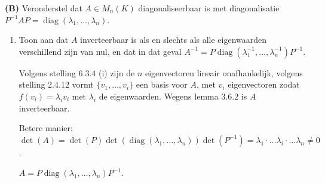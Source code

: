\begin{oefening}[6.3.5] \textbf{(B)}
    Veronderstel dat $A \in M_n(K)$ diagonaliseerbaar is met diagonalisatie $P^{-1}AP = \operatorname{diag}(\lambda_1, \dots, \lambda_n)$.
    \begin{enumerate}
        \item[(a)] Toon aan dat $A$ inverteerbaar is als en slechts als alle eigenwaarden verschillend zijn van nul, en dat in dat geval $A^{-1} = P \operatorname{diag}(\lambda_1^{-1}, \dots, \lambda_n^{-1})P^{-1}$.

        Volgens stelling 6.3.4 (i) zijn de \(n\) eigenvectoren lineair onafhankelijk,
        volgens stelling 2.4.12 vormt \(\{v_1,\dots,v_i\}\) een basis voor \(A\), met \(v_i\) eigenvectoren zodat \(f(v_i) = \lambda_i v_i\) met \(\lambda_i\) de eigenwaarden.
        Wegens lemma 3.6.2 is \(A\) inverteerbaar.

        Betere manier:
        \(\det(A) = \det(P) \det(\operatorname{diag}(\lambda_1, \dots, \lambda_n)) \det(P^{-1}) = \lambda_1 \cdot \dots \lambda_i \cdot \dots \lambda_n \neq 0\).

        \(A = P \operatorname{diag}(\lambda_1, \dots, \lambda_n) P^{-1} \).


\end{enumerate}
\end{oefening}

